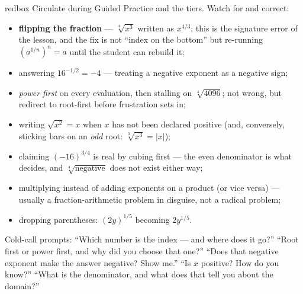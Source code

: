 \documentclass[10pt]{article}
\begin{document}
\begin{skillbox}{redbox}
Circulate during Guided Practice and the tiers. Watch for and correct:
\begin{itemize}[leftmargin=1.2em, nosep]
  \item \textbf{flipping the fraction} --- $\sqrt[4]{x^{3}}$ written as $x^{4/3}$; this is the signature error of the lesson, and the fix is not ``index on the bottom'' but re-running $\left(a^{1/n}\right)^{n}=a$ until the student can rebuild it;
  \item answering $16^{-1/2}=-4$ --- treating a negative exponent as a negative sign;
  \item \emph{power first} on every evaluation, then stalling on $\sqrt[4]{4096}$; not wrong, but redirect to root-first before frustration sets in;
  \item writing $\sqrt{x^{2}}=x$ when $x$ has not been declared positive (and, conversely, sticking bars on an \emph{odd} root: $\sqrt[3]{x^{3}}=|x|$);
  \item claiming $(-16)^{3/4}$ is real by cubing first --- the even denominator is what decides, and $\sqrt[4]{\text{negative}}$ does not exist either way;
  \item multiplying instead of adding exponents on a product (or vice versa) --- usually a fraction-arithmetic problem in disguise, not a radical problem;
  \item dropping parentheses: $(2y)^{1/5}$ becoming $2y^{1/5}$.
\end{itemize}
Cold-call prompts: ``Which number is the index --- and where does it go?'' ``Root first or power
first, and why did you choose that one?'' ``Does that negative exponent make the answer negative?
Show me.'' ``Is $x$ positive? How do you know?'' ``What is the denominator, and what does that tell
you about the domain?''
\end{skillbox}
\end{document}
